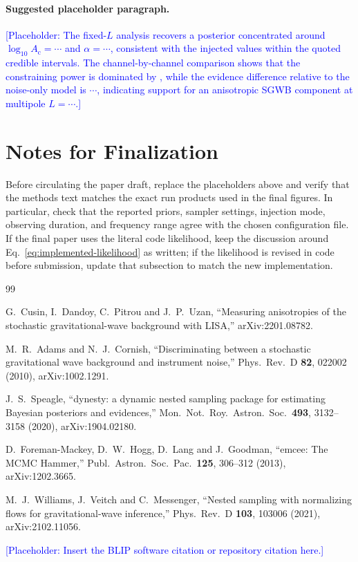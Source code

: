 \documentclass[11pt]{article}
\newcommand{\placeholder}[1]{\textcolor{blue}{[Placeholder: #1]}}
\begin{document}
\paragraph{Suggested placeholder paragraph.}
\placeholder{The fixed-$L$ analysis recovers a posterior concentrated around $\log_{10} A_{\mathrm{c}} = \cdots$ and $\alpha = \cdots$, consistent with the injected values within the quoted credible intervals. The channel-by-channel comparison shows that the constraining power is dominated by \cdots, while the evidence difference relative to the noise-only model is $\cdots$, indicating \cdots support for an anisotropic SGWB component at multipole $L=\cdots$.}

\section*{Notes for Finalization}

Before circulating the paper draft, replace the placeholders above and verify that the methods text matches the exact run products used in the final figures. In particular, check that the reported priors, sampler settings, injection mode, observing duration, and frequency range agree with the chosen configuration file. If the final paper uses the literal code likelihood, keep the discussion around Eq.~\eqref{eq:implemented-likelihood} as written; if the likelihood is revised in code before submission, update that subsection to match the new implementation.

\begin{thebibliography}{99}

G.~Cusin, I.~Dandoy, C.~Pitrou and J.~P.~Uzan,
``Measuring anisotropies of the stochastic gravitational-wave background with LISA,''
arXiv:2201.08782.

M.~R.~Adams and N.~J.~Cornish,
``Discriminating between a stochastic gravitational wave background and instrument noise,''
Phys.\ Rev.\ D {\bf 82}, 022002 (2010),
arXiv:1002.1291.

J.~S.~Speagle,
``dynesty: a dynamic nested sampling package for estimating Bayesian posteriors and evidences,''
Mon.\ Not.\ Roy.\ Astron.\ Soc.\ {\bf 493}, 3132--3158 (2020),
arXiv:1904.02180.

D.~Foreman-Mackey, D.~W.~Hogg, D.~Lang and J.~Goodman,
``emcee: The MCMC Hammer,''
Publ.\ Astron.\ Soc.\ Pac.\ {\bf 125}, 306--312 (2013),
arXiv:1202.3665.

M.~J.~Williams, J.~Veitch and C.~Messenger,
``Nested sampling with normalizing flows for gravitational-wave inference,''
Phys.\ Rev.\ D {\bf 103}, 103006 (2021),
arXiv:2102.11056.

\placeholder{Insert the BLIP software citation or repository citation here.}

\end{thebibliography}
\end{document}
